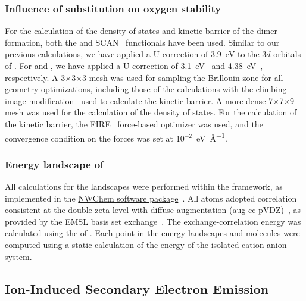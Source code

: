 \begin{refsection}
 \label{appendix:sec-substitutions} 
\subsubsection{Influence of  substitution on oxygen stability} 

For the calculation of the density of states and kinetic barrier of the dimer formation, both the  and \gls{SCAN}~\cite{Sun2015} functionals have been used. Similar to our previous calculations, we have applied a U correction of 3.9~\si{\electronvolt} to the 3$d$ orbitals of . For  and , we have applied a U correction of 3.1~\si{\electronvolt}~\cite{Richards2017} and 4.38~\si{\electronvolt}~\cite{MP_Li2MoO3}, respectively. A 3$\times$3$\times$3  mesh was used for sampling the Brillouin zone for all geometry optimizations, including those of the  calculations with the climbing image modification~\cite{Henkelman2000a} used to calculate the kinetic barrier. A more dense 7$\times$7$\times$9 mesh was used for the calculation of the density of states. For the calculation of the kinetic barrier, the FIRE~\cite{Bitzek2006} force-based optimizer was used, and the convergence condition on the forces was set at 10$^{-2}$~\si{\electronvolt\per\angstrom}.

 \label{appendix:sec-landscape}
\subsubsection{Energy landscape of \ce{[CB11H12]^{-}}}

All calculations for the landscapes were performed within the  framework, as implemented in the \href{http://www.nwchem-sw.org/index.php/Main_Page}{NWChem software package}~\cite{Valiev2010}. All atoms adopted correlation consistent  at the double zeta level with diffuse augmentation (aug-cc-pVDZ)~\cite{Dunning1989, Kendall1992, Prascher2010}, as provided by the EMSL basis set exchange~\cite{Feller1996, Schuchardt2007}. The exchange-correlation energy was calculated using the  of . Each point in the energy landscapes  and  molecules were computed using a static calculation of the energy of the isolated cation-anion system.

\subsection{Ion-Induced Secondary Electron Emission} \label{appendix:sec-quotas} 
 

\end{refsection}
